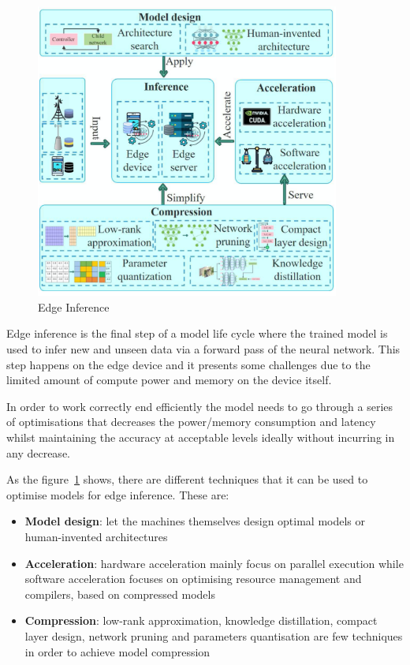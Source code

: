 \begin{figure}[ht]
    \includegraphics[width=10cm]{images/introduction/edge_inference.png}
    \centering
    \caption{Edge Inference}\label{fig:edge_inference}
\end{figure}

Edge inference is the final step of a model life cycle where the trained model
is used to infer new and unseen data via a forward pass of the neural network.
This step happens on the edge device and it presents some challenges due to the
limited amount of compute power and memory on the device itself.

In order to work correctly end efficiently the model needs to go through a
series of optimisations that decreases the power/memory consumption and latency
whilst maintaining the accuracy at acceptable levels \- ideally without
incurring in any decrease.

As the figure~\ref{fig:edge_inference} shows, there are different techniques
that it can be used to optimise models for edge inference. These are:
\begin{itemize}
    \item \textbf{Model design}: let the machines themselves design optimal
        models or human-invented architectures
    \item \textbf{Acceleration}: hardware acceleration mainly focus on parallel
        execution while software acceleration focuses on optimising resource
        management and compilers, based on compressed models
    \item \textbf{Compression}: low-rank approximation, knowledge distillation,
        compact layer design, network pruning and parameters quantisation are
        few techniques in order to achieve model compression
\end{itemize}

